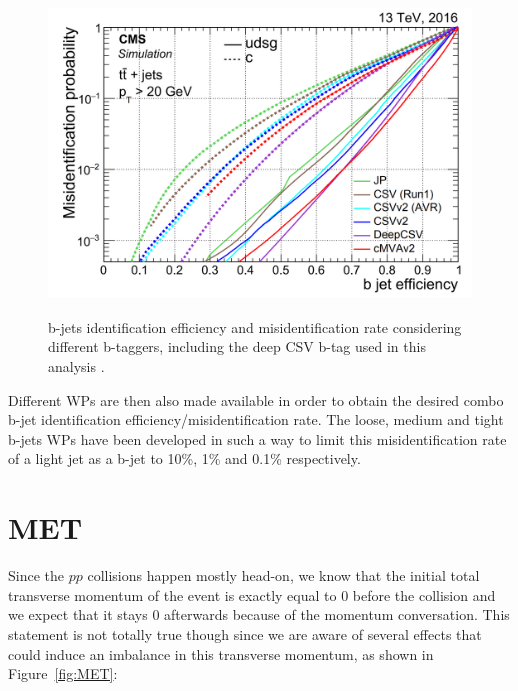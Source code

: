 \documentclass[a4paper, 10pt, openright]{report}
\begin{document}
\begin{figure}[htbp]
\begin{center}
\includegraphics[width=13cm, height=8.5cm]{figs/CMSBTag.png}
\caption{b-jets identification efficiency and misidentification rate considering different b-taggers, including the deep CSV b-tag used in this analysis \cite{BTag}.}
\label{fig:CMSBTag}
\end{center}
\end{figure}

Different \acp{WP} are then also made available in order to obtain the desired combo b-jet identification efficiency/misidentification rate. The loose, medium and tight b-jets \acp{WP} have been developed in such a way to limit this misidentification rate of a light jet as a b-jet to 10\%, 1\% and 0.1\% respectively.

\section{\acf{MET}} \label{section:RecoMET}

Since the $pp$ collisions happen mostly head-on, we know that the initial total transverse momentum of the event is exactly equal to 0 before the collision and we expect that it stays 0 afterwards because of the momentum conversation. This statement is not totally true though since we are aware of several effects that could induce an imbalance in this transverse momentum, as shown in Figure~\ref{fig:MET}:
\end{document}
